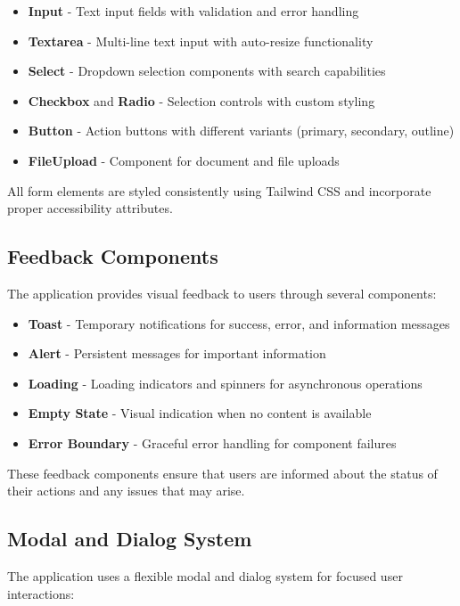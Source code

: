 \begin{itemize}
  \item \textbf{Input} - Text input fields with validation and error handling
  \item \textbf{Textarea} - Multi-line text input with auto-resize functionality
  \item \textbf{Select} - Dropdown selection components with search capabilities
  \item \textbf{Checkbox} and \textbf{Radio} - Selection controls with custom styling
  \item \textbf{Button} - Action buttons with different variants (primary, secondary, outline)
  \item \textbf{FileUpload} - Component for document and file uploads
\end{itemize}

All form elements are styled consistently using Tailwind CSS and incorporate proper accessibility attributes.

\subsection{Feedback Components}

The application provides visual feedback to users through several components:

\begin{itemize}
  \item \textbf{Toast} - Temporary notifications for success, error, and information messages
  \item \textbf{Alert} - Persistent messages for important information
  \item \textbf{Loading} - Loading indicators and spinners for asynchronous operations
  \item \textbf{Empty State} - Visual indication when no content is available
  \item \textbf{Error Boundary} - Graceful error handling for component failures
\end{itemize}

These feedback components ensure that users are informed about the status of their actions and any issues that may arise.

\subsection{Modal and Dialog System}

The application uses a flexible modal and dialog system for focused user interactions:

